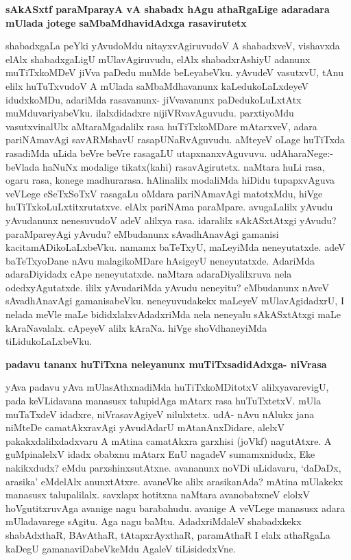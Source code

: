 \noindent
{\bf\large{sAkASxtf paraMparayA vA shabadx hAgu athaRgaLige adaradara mUlada jotege saMbaMdhavidAdxga rasavirutetx}}\label{page181}

shabadxgaLa peYki yAvudoMdu nitayxvAgiruvudoV A shabadxveV, vishavxda elAlx shabadxgaLigU mUlavAgiruvudu, elAlx shabadxrAshiyU adanunx muTiTxkoMDeV jiVva paDedu muMde beLeyabeVku. yAvudeV vasutxvU, tAnu elilx huTuTxvudoV A mUlada saMbaMdhavanunx kaLedukoLaLxdeyeV idudxkoMDu, adariMda rasavanunx- jiVvavanunx paDedukoLuLxtAtx muMduvariyabeVku. ilalxdidadxre nijiVRvavAguvudu. parxtiyoMdu vasutxvinalUlx aMtaraMgadalilx rasa huTiTxkoMDare mAtarxveV, adara pariNAmavAgi savARMshavU rasapUNaRvAguvudu. aMteyeV oLage huTiTxda rasadiMda uLida beVre beVre rasagaLU utapxnanxvAguvuvu. udAharaNege:- beVlada haNuNx modalige tikatx(kahi) rasavAgirutetx. naMtara huLi rasa, ogaru rasa, konege madhurarasa. hAlinalilx modaliMda hiDidu tupapxvAguva veVLege eSeTxSoTxV rasagaLu oMdara pariNAmavAgi matotxMdu, hiVge huTiTxkoLuLxtitxrutatxve. elAlx pariNAma paraMpare. avugaLalilx yAvudu yAvudanunx nenesuvudoV adeV alilxya rasa. idaralilx sAkASxtAtxgi yAvudu? paraMpareyAgi yAvudu? eMbudanunx sAvadhAnavAgi gamanisi kacitamADikoLaLxbeVku. namamx baTeTxyU, maLeyiMda neneyutatxde. adeV baTeTxyoDane nAvu malagikoMDare hAsigeyU neneyutatxde. AdariMda adaraDiyidadx cApe neneyutatxde. naMtara adaraDiyalilxruva nela odedxyAgutatxde. ililx yAvudariMda yAvudu neneyitu? eMbudanunx nAveV sAvadhAnavAgi gamanisabeVku. neneyuvudakekx maLeyeV mUlavAgidadxrU, I nelada meVle maLe bididxlalxvAdadxriMda nela neneyalu sAkASxtAtxgi maLe kAraNavalalx. cApeyeV alilx kAraNa. hiVge shoVdhaneyiMda tiLidukoLaLxbeVku.

\noindent
{\bf\large{padavu tananx huTiTxna neleyanunx muTiTxsadidAdxga- niVrasa}}\label{page182}

yAva padavu yAva mUlasAthxnadiMda huTiTxkoMDitotxV alilxyavarevigU, pada keVLidavana manasusx talupidAga mAtarx rasa huTuTxtetxV. mUla muTaTxdeV idadxre, niVrasavAgiyeV nilulxtetx. udA- nAvu nAlukx jana niMteDe camatAkxravAgi yAvudAdarU mAtanAnxDidare, alelxV pakakxdalilxdadxvaru A mAtina camatAkxra garxhisi (joVkf) nagutAtxre. A guMpinalelxV idadx obabxnu mAtarx EnU nagadeV sumamxnidudx, Eke nakikxdudx? eMdu parxshinxsutAtxne. avananunx noVDi uLidavaru, `daDaDx, arasika' eMdelAlx anunxtAtxre. avaneVke alilx arasikanAda? mAtina mUlakekx manasusx talupalilalx. savxlapx hotitxna naMtara avanobabxneV elolxV hoVgutitxruvAga avanige nagu barabahudu. avanige A veVLege manasusx adara mUladavarege sAgitu. Aga nagu baMtu. AdadxriMdaleV shabadxkekx shabAdxthaR, BAvAthaR, tAtapxrAyxthaR, paramAthaR I elalx athaRgaLa kaDegU gamanaviDabeVkeMdu AgaleV tiLisidedxVne.

